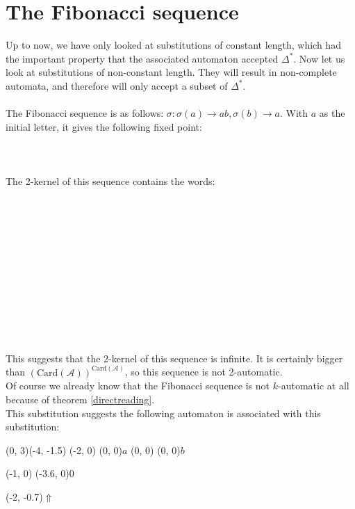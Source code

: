 \documentclass{article}
\begin{document}
\section*{The Fibonacci sequence}
Up to now, we have only looked at substitutions of constant length, which had
the important property that the associated automaton accepted
$\Delta^*$. Now let us look at substitutions of non-constant
length. They will result in non-complete automata, and therefore will only
accept a subset of $\Delta^*$.\\
\\
The Fibonacci sequence is as follows: $\sigma: \sigma(a) \rightarrow ab,
\sigma(b) \rightarrow a$. With $a$ as the initial letter, it gives the
following fixed point:\\
\\
\\
\\
The 2-kernel of this sequence contains the words:\\
\\
\\
\\
\\
\\
\\
\\
\\
\\
\\
\monoit{}\\
\\
This suggests that the 2-kernel of this sequence is infinite. It is certainly
bigger than $(\mathrm{Card}(\mathcal{A}))^{\mathrm{Card}(\mathcal{A})}$, so
this sequence is not 2-automatic.\\
Of course we already know that the Fibonacci sequence is not $k$-automatic at
all because of theorem \ref{directreading}.
\\
This substitution suggests the following automaton is associated with this
substitution:\\
\begin{graph}(0, 3)(-4, -1.5)
  (-2, 0) (0, 0){$a$}
  (0, 0)  (0, 0){$b$}

  (-1, 0) \freetext(-3.6, 0){0}
   
   

  \freetext(-2, -0.7){$\Uparrow$}
\end{graph}\\
\end{document}

